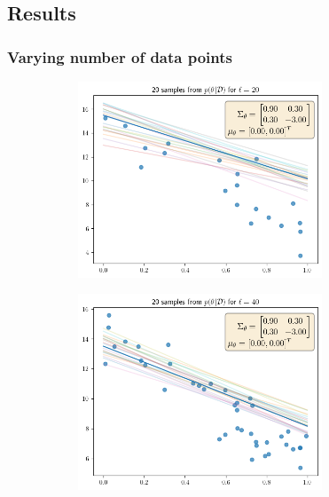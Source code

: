 \subsection{Results}
\subsubsection{Varying number of data points}
\begin{figure}[H]
\begin{subfigure}{.5\textwidth}
  \centering
  \includegraphics[width=0.8\textwidth]{assets/week1/fixed-prior-20-samples.png}
\end{subfigure}%
\begin{subfigure}{.5\textwidth}
  \centering
  \includegraphics[width=0.8\textwidth]{assets/week1/fixed-prior-40-samples.png}
\end{subfigure}\\

\end{figure}

